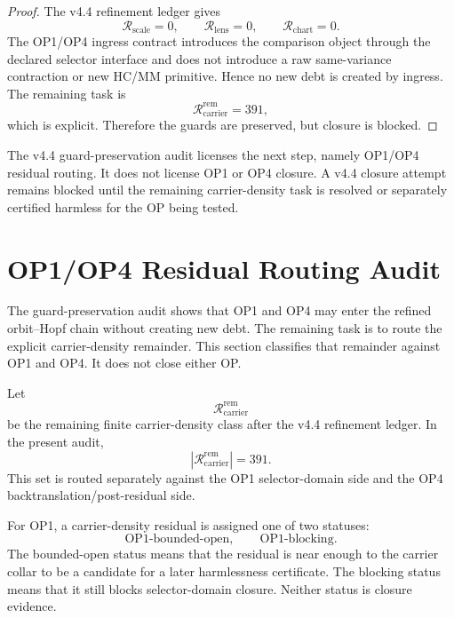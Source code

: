\begin{proof}
The v4.4 refinement ledger gives
\[
    \mathcal R_{\mathrm{scale}}=0,\qquad
    \mathcal R_{\mathrm{lens}}=0,\qquad
    \mathcal R_{\mathrm{chart}}=0.
\]
The OP1/OP4 ingress contract introduces the comparison object through the
declared selector interface and does not introduce a raw same-variance
contraction or new HC/MM primitive.  Hence no new debt is created by ingress.
The remaining task is
\[
    \mathcal R_{\mathrm{carrier}}^{\mathrm{rem}}=391,
\]
which is explicit.  Therefore the guards are preserved, but closure is blocked.
\end{proof}

\begin{theorem}
The v4.4 guard-preservation audit licenses the next step, namely OP1/OP4
residual routing.  It does not license OP1 or OP4 closure.  A v4.4 closure
attempt remains blocked until the remaining carrier-density task is resolved
or separately certified harmless for the OP being tested.
\end{theorem}



\section{OP1/OP4 Residual Routing Audit}
\label{sec:v44-op1-op4-residual-routing-audit}

The guard-preservation audit shows that OP1 and OP4 may enter the refined
orbit--Hopf chain without creating new debt.  The remaining task is to route
the explicit carrier-density remainder.  This section classifies that
remainder against OP1 and OP4.  It does not close either OP.

\begin{definition}
Let
\[
    \mathcal R_{\mathrm{carrier}}^{\mathrm{rem}}
\]
be the remaining finite carrier-density class after the v4.4 refinement
ledger.  In the present audit,
\[
    |\mathcal R_{\mathrm{carrier}}^{\mathrm{rem}}|=391.
\]
This set is routed separately against the OP1 selector-domain side and the OP4
backtranslation/post-residual side.
\end{definition}

\begin{definition}
For OP1, a carrier-density residual is assigned one of two statuses:
\[
\mathrm{OP1\text{-}bounded\text{-}open},
\qquad
\mathrm{OP1\text{-}blocking}.
\]
The bounded-open status means that the residual is near enough to the carrier
collar to be a candidate for a later harmlessness certificate.  The blocking
status means that it still blocks selector-domain closure.  Neither status is
closure evidence.
\end{definition}

